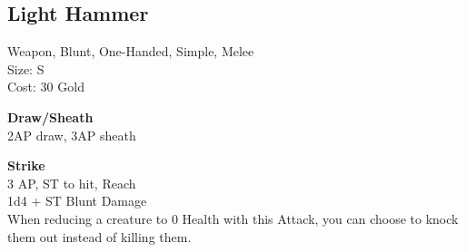 \subsection{Light Hammer}\label{weapon:lightHammer}
Weapon, Blunt, One-Handed, Simple, Melee\\
Size: S\\
Cost: 30 Gold

\textbf{Draw/Sheath} \\
2AP draw, 3AP sheath

\textbf{Strike} \\
3 AP, ST to hit,  Reach\\
1d4 + \texttimes ST Blunt Damage\\
When reducing a creature to 0 Health with this Attack, you can choose to knock them out instead of killing them.
